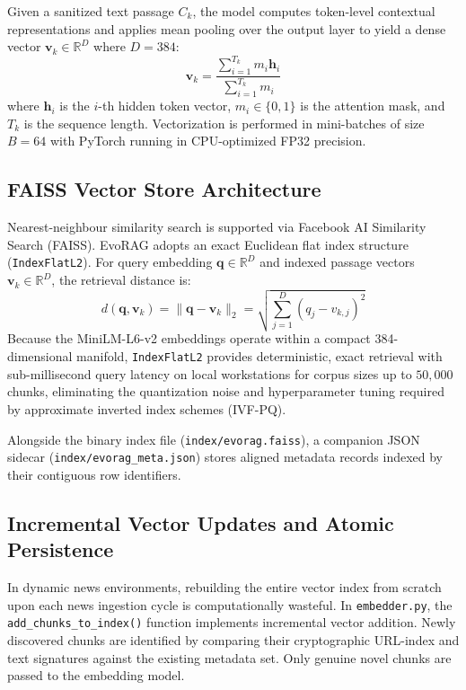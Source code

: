 Given a sanitized text passage $C_k$, the model computes token-level contextual representations and applies mean pooling over the output layer to yield a dense vector $\mathbf{v}_k \in \mathbb{R}^{D}$ where $D = 384$:
\begin{equation}
\label{eq:mean_pooling}
\mathbf{v}_k = \frac{\sum_{i=1}^{T_k} m_i \mathbf{h}_i}{\sum_{i=1}^{T_k} m_i}
\end{equation}
where $\mathbf{h}_i$ is the $i$-th hidden token vector, $m_i \in \{0, 1\}$ is the attention mask, and $T_k$ is the sequence length. Vectorization is performed in mini-batches of size $B = 64$ with PyTorch running in CPU-optimized FP32 precision.

\subsection{FAISS Vector Store Architecture}
Nearest-neighbour similarity search is supported via Facebook AI Similarity Search (FAISS). EvoRAG adopts an exact Euclidean flat index structure (\texttt{IndexFlatL2}). For query embedding $\mathbf{q} \in \mathbb{R}^{D}$ and indexed passage vectors $\mathbf{v}_k \in \mathbb{R}^{D}$, the retrieval distance is:
\begin{equation}
\label{eq:l2_distance}
d(\mathbf{q}, \mathbf{v}_k) = \|\mathbf{q} - \mathbf{v}_k\|_2 = \sqrt{\sum_{j=1}^{D} (q_j - v_{k,j})^2}
\end{equation}
Because the MiniLM-L6-v2 embeddings operate within a compact 384-dimensional manifold, \texttt{IndexFlatL2} provides deterministic, exact retrieval with sub-millisecond query latency on local workstations for corpus sizes up to $50,000$ chunks, eliminating the quantization noise and hyperparameter tuning required by approximate inverted index schemes (IVF-PQ).

Alongside the binary index file (\texttt{index/evorag.faiss}), a companion JSON sidecar (\texttt{index/evorag\_meta.json}) stores aligned metadata records indexed by their contiguous row identifiers.

\subsection{Incremental Vector Updates and Atomic Persistence}
In dynamic news environments, rebuilding the entire vector index from scratch upon each news ingestion cycle is computationally wasteful. In \texttt{embedder.py}, the \texttt{add\_chunks\_to\_index()} function implements incremental vector addition. Newly discovered chunks are identified by comparing their cryptographic URL-index and text signatures against the existing metadata set. Only genuine novel chunks are passed to the embedding model.

